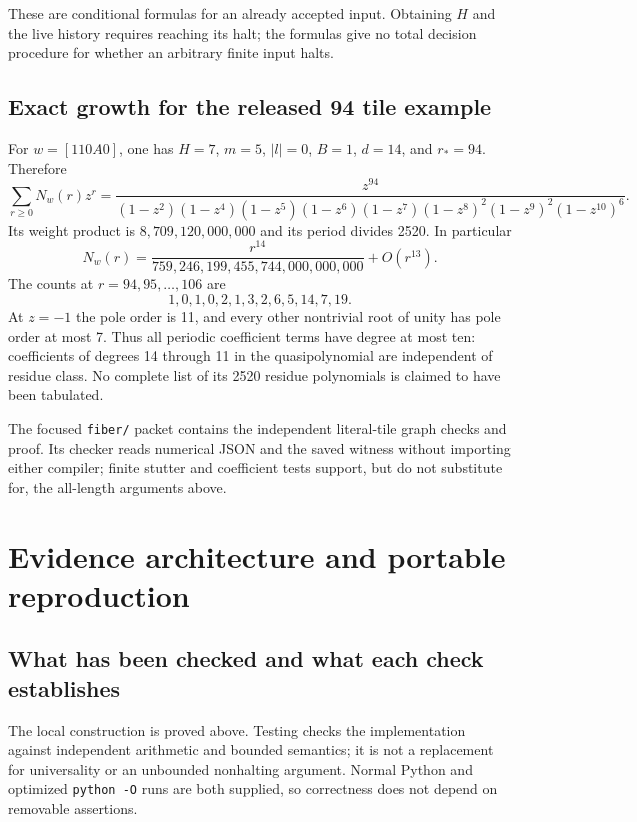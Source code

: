 \documentclass[11pt,letterpaper]{article}
\theoremstyle{definition}
\theoremstyle{remark}
\newcommand{\code}[1]{\nolinkurl{#1}}
\begin{document}
These are conditional formulas for an already accepted input. Obtaining $H$ and the live history requires reaching its halt; the formulas give no total decision procedure for whether an arbitrary finite input halts.

\subsection{Exact growth for the released 94 tile example}
For $w=[110A0]$, one has $H=7$, $m=5$, $|l|=0$, $B=1$, $d=14$, and $r_*=94$. Therefore
\begin{equation}\label{gts:um:eq:exampleGF}
 \sum_{r\geq0}N_w(r)z^r
 =\frac{z^{94}}
 {(1-z^2)(1-z^4)(1-z^5)(1-z^6)(1-z^7)
 (1-z^8)^2(1-z^9)^2(1-z^{10})^6}.
\end{equation}
Its weight product is $8{,}709{,}120{,}000{,}000$ and its period divides 2520. In particular
\[
 N_w(r)=\frac{r^{14}}{759{,}246{,}199{,}455{,}744{,}000{,}000{,}000}
                +O(r^{13}).
\]
The counts at $r=94,95,\ldots,106$ are
\[
 1,0,1,0,2,1,3,2,6,5,14,7,19.
\]
At $z=-1$ the pole order is 11, and every other nontrivial root of unity has pole order at most 7. Thus all periodic coefficient terms have degree at most ten: coefficients of degrees 14 through 11 in the quasipolynomial are independent of residue class. No complete list of its 2520 residue polynomials is claimed to have been tabulated.

The focused \code{fiber/} packet \cite{um-Fiber} contains the independent literal-tile graph checks and proof. Its checker reads numerical JSON and the saved witness without importing either compiler; finite stutter and coefficient tests support, but do not substitute for, the all-length arguments above.

\section{Evidence architecture and portable reproduction}
\label{gts:um:sec:reproduce}
\subsection{What has been checked and what each check establishes}
The local construction is proved above. Testing checks the implementation against independent arithmetic and bounded semantics; it is not a replacement for universality or an unbounded nonhalting argument. Normal Python and optimized \texttt{python -O} runs are both supplied, so correctness does not depend on removable assertions.
\end{document}

